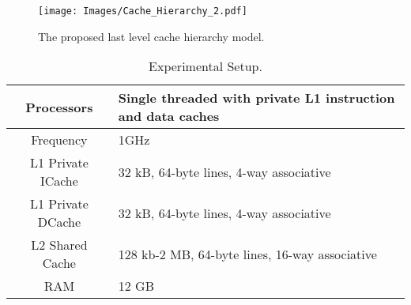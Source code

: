 \begin{figure}[!tb]
\centering
\texttt{[image: Images/Cache\_Hierarchy\_2.pdf]}
\caption{The proposed last level cache hierarchy model.}\label{Fig:cache_hierarchy}
\end{figure}
\begin{table}[!tb] %
\centering
\caption{Experimental Setup.}
\label{Table:Experimental_Set_Up}
\begin{tabular}{|c|p{1.5in}|} 
\hline Processors & Single threaded with private L1 instruction and data caches \\
\hline Frequency & 1GHz \\
\hline L1 Private ICache & 32 kB, 64-byte lines, 4-way associative\\
\hline L1 Private DCache & 32 kB, 64-byte lines, 4-way associative \\
\hline L2 Shared Cache & 128 kb-2 MB, 64-byte lines, 16-way associative \\
\hline RAM & 12 GB \\
\hline
\end{tabular}
\end{table}
